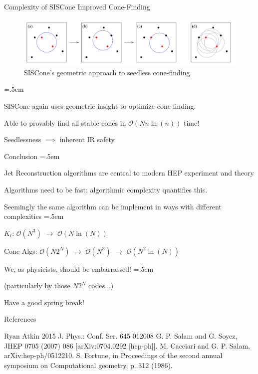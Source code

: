 \documentclass[xcolor={dvipsnames}]{beamer}
\let\olditemize=\itemize
\let\endolditemize=\enditemize
\renewenvironment{itemize}{\olditemize \itemsep=.5em }{\endolditemize}
\newcommand{\ord}[1]{\mathcal{O}(#1)}
\begin{document}
\begin{frame}{Complexity of SISCone}
\alert{Improved Cone-Finding}
\begin{figure}
    \centering
    \includegraphics[scale=0.27]{siscone.PNG}
    \caption{SISCone's geometric approach to seedless cone-finding.}
\end{figure}
\begin{itemize}
    \item<2-> SISCone again uses geometric insight to optimize cone finding.
    \item<3-> Able to provably find all stable cones in $\ord{Nn\ln(n)}$ time!
    \item<4-> Seedlessness $\implies$ inherent IR safety
\end{itemize}
\end{frame}

\begin{frame}{Conclusion}
\begin{itemize}
    \item<1-> Jet Reconstruction algorithms are central to modern HEP experiment and theory
    \item<2-> Algorithms need to be fast; algorithmic complexity quantifies this.
    \item<3-> Seemingly the same algorithm can be implement in ways with different complexities
    \begin{itemize}
        \item<4-> $K_t$: $\ord{N^3}$ $\to$ $\ord{N\ln(N)}$
        \item<5-> Cone Algs: $\ord{N2^N}$ $\to$ $\ord{N^3}$ $\to$ $\ord{N^2\ln(N)}$
    \end{itemize}
    \item<6-> We, as physicists, should be embarrassed!
    \begin{itemize}
        \item<7-> (particularly by those $N2^N$ codes...)
    \end{itemize}
    \item<8> Have a good spring break!
\end{itemize}
\end{frame}

\begin{frame}{References}
\begin{thebibliography}{5}
     Ryan Atkin 2015 J. Phys.: Conf. Ser. 645 012008
     G. P. Salam and G. Soyez, JHEP 0705 (2007) 086 [arXiv:0704.0292 [hep-ph]].
     M. Cacciari and G. P. Salam, arXiv:hep-ph/0512210.
     S. Fortune, in Proceedings of the second annual symposium on Computational geometry, p. 312 (1986).
\end{thebibliography}
\end{frame}
\end{document}
